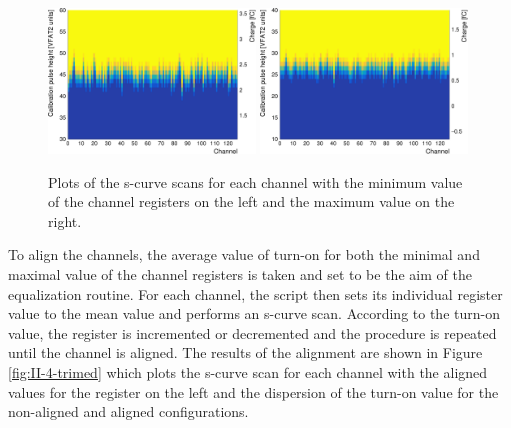       \begin{figure}[b!]
        \centering
        \includegraphics[width=0.49\textwidth]{img/plots/cSCurve_ChannelVCal_Trim0-crop}
        \includegraphics[width=0.49\textwidth]{img/plots/cSCurve_ChannelVCal_Trim1-crop}
        \caption{Plots of the s-curve scans for each channel with the minimum value of the channel registers on the left and the maximum value on the right.}
        \label{fig:II-4-trim}
      \end{figure}

      To align the channels, the average value of turn-on for both the minimal and maximal value of the channel registers is taken and set to be the aim of the equalization routine. For each channel, the script then sets its individual register value to the mean value and performs an s-curve scan. According to the turn-on value, the register is incremented or decremented and the procedure is repeated until the channel is aligned. The results of the alignment are shown in Figure \ref{fig:II-4-trimed} which plots the s-curve scan for each channel with the aligned values for the register on the left and the dispersion of the turn-on value for the non-aligned and aligned configurations. \\

